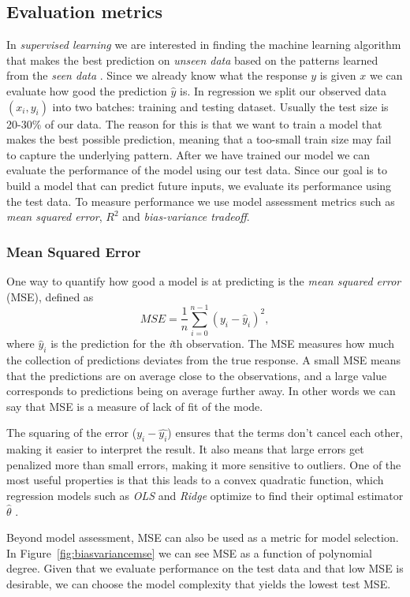 \documentclass[amssymb,twocolumn,aps]{revtex4}
\begin{document}
\subsection{Evaluation metrics}
In \textit{supervised learning} we are interested in finding the machine learning algorithm that makes the best prediction on \textit{unseen data} based on the patterns learned from the \textit{seen data} \cite{fysml6}. Since we already know what the response $y$ is given $x$ we can evaluate how good the prediction $\hat{y}$ is. In regression we split our observed data $(x_i, y_i)$ into two batches: training and testing dataset. Usually the test size is 20-30\% of our data. The reason for this is that we want to train a model that makes the best possible prediction, meaning that a too-small train size may fail to capture the underlying pattern. After we have trained our model we can evaluate the performance of the model using our test data. Since our goal is to build a model that can predict future inputs, we evaluate its performance using the test data. To measure performance we use model assessment metrics such as \textit{mean squared error}, \textit{$R^2$} and \textit{bias-variance tradeoff}.

\subsubsection{Mean Squared Error}
One way to quantify how good a model is at predicting is the \textit{mean squared error} (MSE), defined as
$$MSE = \frac{1}{n}\sum_{i=0}^{n-1}(y_i-\hat{y}_i)^2,$$
where $\hat{y}_i$ is the prediction for the \textit{i}th observation. The MSE measures how much the collection of predictions deviates from the true response. A small MSE means that the predictions are on average close to the observations, and a large value corresponds to predictions being on average further away. In other words we can say that MSE is a measure of lack of fit of the mode.

The squaring of the error ($y_i-\hat{y_i}$) ensures that the terms don't cancel each other, making it easier to interpret the result. It also means that large errors get penalized more than small errors, making it more sensitive to outliers. One of the most useful properties is that this leads to a convex quadratic function, which regression models such as \textit{OLS} and \textit{Ridge} optimize to find their optimal estimator $\hat{\theta}$ \cite{introstat3}.

Beyond model assessment, MSE can also be used as a metric for model selection. In Figure~\ref{fig:biasvariancemse} we can see MSE as a function of polynomial degree. Given that we evaluate performance on the test data and that low MSE is desirable, we can choose the model complexity that yields the lowest test MSE.
\end{document}
